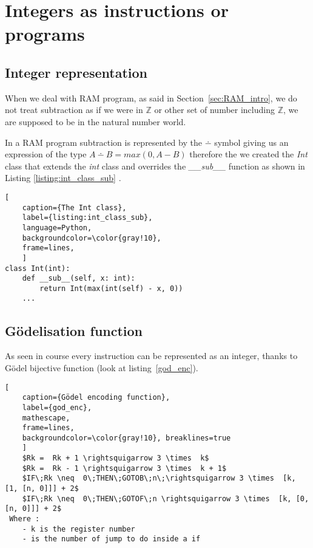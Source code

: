 \section{Integers as instructions or programs}

\subsection{Integer representation}
When we deal with RAM program, as said in Section~\ref{sec:RAM_intro}, we do not treat subtraction as if we were in $\mathbb{Z}$ or other set of number including $\mathbb{Z}$, we are supposed to be in the natural number world. 

In a RAM program subtraction is represented by the $\dotminus$ symbol giving us an expression of the type $A \dotminus B = max(0, A - B)$ therefore the we created the \textit{Int} class that extends the \textit{int} class and overrides the \textit{\_\_sub\_\_} function as shown in Listing \ref{listing:int_class_sub} .

\begin{lstlisting}[
    caption={The Int class}, 
    label={listing:int_class_sub},
    language=Python,
    backgroundcolor=\color{gray!10},
    frame=lines,
    ]
class Int(int):
    def __sub__(self, x: int):
        return Int(max(int(self) - x, 0))
    ...
\end{lstlisting}


\subsection{Gödelisation function}
As seen in course every instruction can be represented as an integer, thanks to Gödel bijective function (look at listing~\ref{god_enc}).

\begin{lstlisting}[
    caption={Gödel encoding function}, 
    label={god_enc},
    mathescape, 
    frame=lines,
    backgroundcolor=\color{gray!10}, breaklines=true
    ]
    $Rk =  Rk + 1 \rightsquigarrow 3 \times  k$ 
    $Rk =  Rk - 1 \rightsquigarrow 3 \times  k + 1$
    $IF\;Rk \neq  0\;THEN\;GOTOB\;n\;\rightsquigarrow 3 \times  [k, [1, [n, 0]]] + 2$ 
    $IF\;Rk \neq  0\;THEN\;GOTOF\;n \rightsquigarrow 3 \times  [k, [0, [n, 0]]] + 2$
 Where : 
    - k is the register number
    - is the number of jump to do inside a if
\end{lstlisting}

\newpage
